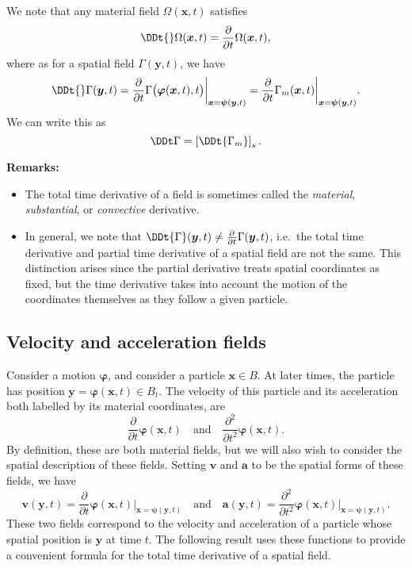 \documentclass[
  letterpaper,
  DIV=11,
  numbers=noendperiod]{scrreprt}
\theoremstyle{plain}
\theoremstyle{remark}
\begin{document}
We note that any material field \(\Omega({\boldsymbol{x}},t)\) satisfies
\[\DDt{}\Omega({\boldsymbol{x}},t)=\frac{\partial}{\partial t}\Omega({\boldsymbol{x}},t),\]
where as for a spatial field \(\Gamma({\boldsymbol{y}},t)\), we have
\[\DDt{}\Gamma({\boldsymbol{y}},t) = \frac{\partial}{\partial t}\Gamma\big({\boldsymbol{\varphi}}({\boldsymbol{x}},t),t\big)\bigg|_{{\boldsymbol{x}}={\boldsymbol{\psi}}({\boldsymbol{y}},t)}= \frac{\partial}{\partial t}\Gamma_m({\boldsymbol{x}},t)\bigg|_{{\boldsymbol{x}}={\boldsymbol{\psi}}({\boldsymbol{y}},t)}.\]
We can write this as \[\DDt\Gamma = \left[\DDt{\Gamma_m}\right]_s.\]

\textbf{Remarks:}

\begin{itemize}
\item
  The total time derivative of a field is sometimes called the
  \emph{material}, \emph{substantial}, or \emph{convective} derivative.
\item
  In general, we note that
  \(\DDt{\Gamma}({\boldsymbol{y}},t)\neq \frac{\partial}{\partial t}\Gamma({\boldsymbol{y}},t)\),
  i.e.~the total time derivative and partial time derivative of a
  spatial field are not the same. This distinction arises since the
  partial derivative treats spatial coordinates as fixed, but the time
  derivative takes into account the motion of the coordinates themselves
  as they follow a given particle.
\end{itemize}

\subsection{Velocity and acceleration
fields}\label{velocity-and-acceleration-fields}

Consider a motion \({\boldsymbol{\varphi}}\), and consider a particle
\({\boldsymbol{x}}\in B\). At later times, the particle has position
\({\boldsymbol{y}}= {\boldsymbol{\varphi}}({\boldsymbol{x}},t)\in B_t\).
The velocity of this particle and its acceleration both labelled by its
material coordinates, are
\[\frac{\partial}{\partial t}{\boldsymbol{\varphi}}({\boldsymbol{x}},t)\quad\text{and}\quad
  \frac{\partial^2}{\partial t^2}{\boldsymbol{\varphi}}({\boldsymbol{x}},t).\]
By definition, these are both material fields, but we will also wish to
consider the spatial description of these fields. Setting
\({\boldsymbol{v}}\) and \({\boldsymbol{a}}\) to be the spatial forms of
these fields, we have
\[{\boldsymbol{v}}({\boldsymbol{y}},t) = \frac{\partial}{\partial t}{\boldsymbol{\varphi}}({\boldsymbol{x}},t)\bigg|_{{\boldsymbol{x}}={\boldsymbol{\psi}}({\boldsymbol{y}},t)}\quad\text{and}\quad
  {\boldsymbol{a}}({\boldsymbol{y}},t) = \frac{\partial^2}{\partial t^2}{\boldsymbol{\varphi}}({\boldsymbol{x}},t)\bigg|_{{\boldsymbol{x}}={\boldsymbol{\psi}}({\boldsymbol{y}},t)}.\]
These two fields correspond to the velocity and acceleration of a
particle whose spatial position is \({\boldsymbol{y}}\) at time \(t\).
The following result uses these functions to provide a convenient
formula for the total time derivative of a spatial field.
\end{document}
